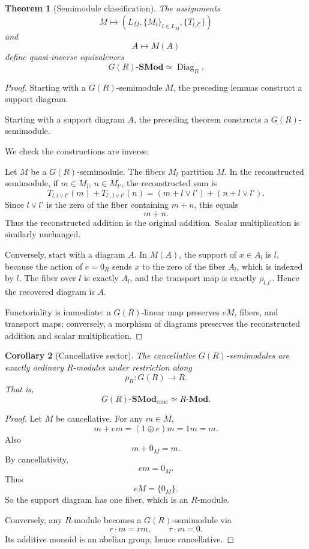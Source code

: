 \documentclass[11pt]{article}
\newtheorem{theorem}{Theorem}[section]
\newtheorem{corollary}[theorem]{Corollary}
\newcommand{\Diag}{\operatorname{Diag}}
\begin{document}
\begin{theorem}[Semimodule classification]
The assignments
\[
M\longmapsto
(L_M,\{M_l\}_{l\in L_M},\{T_{l,l'}\})
\]
and
\[
A\longmapsto M(A)
\]
define quasi-inverse equivalences
\[
G(R)\text{-}\mathbf{SMod}
\simeq
\Diag_R.
\]
\end{theorem}

\begin{proof}
Starting with a \(G(R)\)-semimodule \(M\), the preceding lemmas construct a support diagram.

Starting with a support diagram \(A\), the preceding theorem constructs a \(G(R)\)-semimodule.

We check the constructions are inverse.

Let \(M\) be a \(G(R)\)-semimodule. The fibers \(M_l\) partition \(M\). In the reconstructed semimodule, if \(m\in M_l\), \(n\in M_{l'}\), the reconstructed sum is
\[
T_{l,l\vee l'}(m)+T_{l',l\vee l'}(n)
=
(m+l\vee l')+(n+l\vee l').
\]
Since \(l\vee l'\) is the zero of the fiber containing \(m+n\), this equals
\[
m+n.
\]
Thus the reconstructed addition is the original addition. Scalar multiplication is similarly unchanged.

Conversely, start with a diagram \(A\). In \(M(A)\), the support of \(x\in A_l\) is \(l\), because the action of \(e=0_R\) sends \(x\) to the zero of the fiber \(A_l\), which is indexed by \(l\). The fiber over \(l\) is exactly \(A_l\), and the transport map is exactly \(\rho_{l,l'}\). Hence the recovered diagram is \(A\).

Functoriality is immediate: a \(G(R)\)-linear map preserves \(eM\), fibers, and transport maps; conversely, a morphism of diagrams preserves the reconstructed addition and scalar multiplication.
\end{proof}

\begin{corollary}[Cancellative sector]
The cancellative \(G(R)\)-semimodules are exactly ordinary \(R\)-modules under restriction along
\[
p_R:G(R)\to R.
\]
That is,
\[
G(R)\text{-}\mathbf{SMod}_{\mathrm{canc}}
\simeq
R\text{-}\mathbf{Mod}.
\]
\end{corollary}

\begin{proof}
Let \(M\) be cancellative. For any \(m\in M\),
\[
m+em=(1\oplus e)m=1m=m.
\]
Also
\[
m+0_M=m.
\]
By cancellativity,
\[
em=0_M.
\]
Thus
\[
eM=\{0_M\}.
\]
So the support diagram has one fiber, which is an \(R\)-module.

Conversely, any \(R\)-module becomes a \(G(R)\)-semimodule via
\[
r\cdot m=rm,\qquad \tau\cdot m=0.
\]
Its additive monoid is an abelian group, hence cancellative.
\end{proof}
\end{document}
